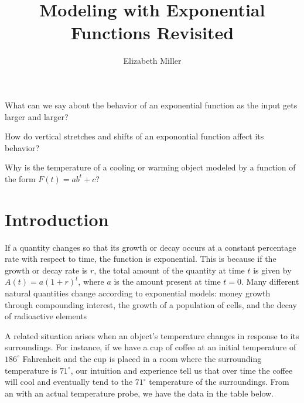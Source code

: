 \documentclass[nooutcomes]{ximera}
\author{Elizabeth Miller}
\title{Modeling with Exponential Functions Revisited}
\begin{document}
\begin{abstract}
  
\end{abstract}
\maketitle



\begin{motivatingQuestions}
\item What can we say about the behavior of an exponential function as the input gets larger and larger?
\item How do vertical stretches and shifts of an exponontial function affect its behavior?
\item Why is the temperature of a cooling or warming object modeled by a function of the form \(F(t) = ab^t + c\)?
\end{motivatingQuestions}



\section{Introduction}
If a quantity changes so that its growth or decay occurs at a constant percentage rate with respect to time, the function is exponential.  This is because if the growth or decay rate is \(r\), the total amount of the quantity at time \(t\) is given by \(A(t) = a(1+r)^t\), where \(a\) is the amount present at time \(t = 0\).  Many different natural quantities change according to exponential models:  money growth through compounding interest, the growth of a population of cells, and the decay of radioactive elements

A related situation arises when an object's temperature changes in response to its surroundings.  For instance, if we have a cup of coffee at an initial temperature of \(186^\circ\) Fahrenheit and the cup is placed in a room where the surrounding temperature is \(71^\circ\), our intuition and experience tell us that over time the coffee will cool and eventually tend to the \(71^\circ\) temperature of the surroundings.  From an  with an actual temperature probe, we have the data in the table below.
\end{document}
